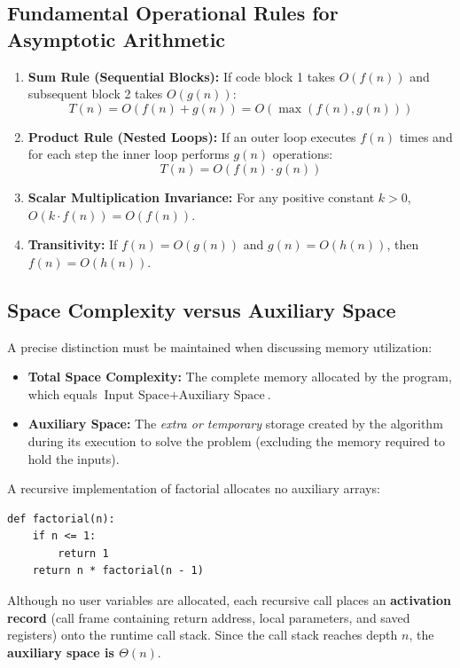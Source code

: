 \documentclass[11pt,a4paper]{article}
\begin{document}
\subsection{Fundamental Operational Rules for Asymptotic Arithmetic}
\begin{enumerate}[leftmargin=2em]
    \item \textbf{Sum Rule (Sequential Blocks):} If code block 1 takes $O(f(n))$ and subsequent block 2 takes $O(g(n))$:
    \[
    T(n) = O(f(n) + g(n)) = O(\max(f(n), g(n)))
    \]
    \item \textbf{Product Rule (Nested Loops):} If an outer loop executes $f(n)$ times and for each step the inner loop performs $g(n)$ operations:
    \[
    T(n) = O(f(n) \cdot g(n))
    \]
    \item \textbf{Scalar Multiplication Invariance:} For any positive constant $k > 0$, $O(k \cdot f(n)) = O(f(n))$.
    \item \textbf{Transitivity:} If $f(n) = O(g(n))$ and $g(n) = O(h(n))$, then $f(n) = O(h(n))$.
\end{enumerate}

\subsection{Space Complexity versus Auxiliary Space}
A precise distinction must be maintained when discussing memory utilization:
\begin{itemize}[itemsep=2pt]
    \item \textbf{Total Space Complexity:} The complete memory allocated by the program, which equals $\text{Input Space} + \text{Auxiliary Space}$.
    \item \textbf{Auxiliary Space:} The \emph{extra or temporary} storage created by the algorithm during its execution to solve the problem (excluding the memory required to hold the inputs).
\end{itemize}

\begin{examplebox}
A recursive implementation of factorial allocates no auxiliary arrays:
\begin{lstlisting}[style=pythonstyle]
def factorial(n):
    if n <= 1:
        return 1
    return n * factorial(n - 1)
\end{lstlisting}
Although no user variables are allocated, each recursive call places an \textbf{activation record} (call frame containing return address, local parameters, and saved registers) onto the runtime call stack. Since the call stack reaches depth $n$, the \textbf{auxiliary space is $\Theta(n)$}.
\end{examplebox}
\end{document}
